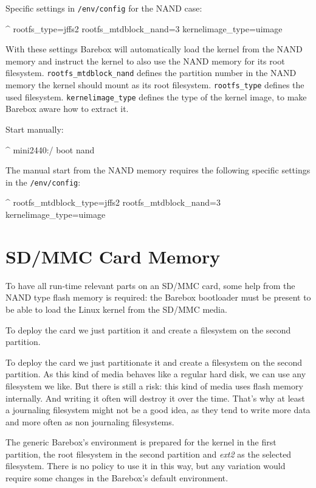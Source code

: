 Specific settings in \texttt{/env/config} for the NAND case:

\begin{ptxshell}[escapechar=|]{^}
rootfs_type=jffs2
rootfs_mtdblock_nand=3
kernelimage_type=uimage
\end{ptxshell}

With these settings Barebox will automatically load the kernel from the NAND
memory and instruct the kernel to also use the NAND memory for its root
filesystem. \texttt{rootfs\_mtdblock\_nand} defines the partition number in the
NAND memory the kernel should mount as its root filesystem. \texttt{rootfs\_type}
defines the used filesystem. \texttt{kernelimage\_type} defines the type of the
kernel image, to make Barebox aware how to extract it.

Start manually:

\begin{ptxshell}[escapechar=|]{^}
mini2440:/ boot nand
\end{ptxshell}

The manual start from the NAND memory requires the following specific settings
in the \texttt{/env/config}:

\begin{ptxshell}[escapechar=|]{^}
rootfs_mtdblock_type=jffs2
rootfs_mtdblock_nand=3
kernelimage_type=uimage
\end{ptxshell}

\section{SD/MMC Card Memory}

To have all run-time relevant parts on an SD/MMC card, some help from the
NAND type flash memory is required: the Barebox bootloader must be present
to be able to load the Linux kernel from the SD/MMC media.

To deploy the card we just partition it and create a filesystem on the second
partition.

To deploy the card we just partitionate it and create a filesystem on the second
partition. As this kind of media behaves like a regular hard disk, we can use
any filesystem we like. But there is still a risk: this kind of media uses flash
memory internally. And writing it often will destroy it over the time. That's why
at least a journaling filesystem might not be a good idea, as they tend to write
more data and more often as non journaling filesystems.

The generic Barebox's environment is prepared for the kernel in the first partition,
the root filesystem in the second partition and \textit{ext2} as the selected
filesystem. There is no policy to use it in this way, but any variation would
require some changes in the Barebox's default environment.

